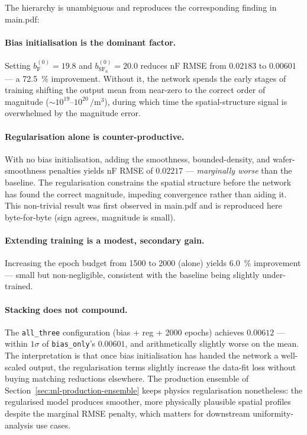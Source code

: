 The hierarchy is unambiguous and reproduces the corresponding finding in
main.pdf:

\paragraph{Bias initialisation is the dominant factor.}
Setting $b^{(0)}_\mathrm{F} = 19.8$ and $b^{(0)}_{\mathrm{SF}_6} = 20.0$
reduces nF RMSE from $0.02183$ to $0.00601$ — a \SI{72.5}{\percent}
improvement. Without it, the network spends the early stages of training
shifting the output mean from near-zero to the correct order of magnitude
($\sim$$10^{19}$--$10^{20}\,\si{\per\meter\cubed}$), during which time the
spatial-structure signal is overwhelmed by the magnitude error.

\paragraph{Regularisation alone is counter-productive.}
With no bias initialisation, adding the smoothness, bounded-density, and
wafer-smoothness penalties yields nF RMSE of $0.02217$ — \emph{marginally
worse} than the baseline. The regularisation constrains the spatial
structure before the network has found the correct magnitude, impeding
convergence rather than aiding it. This non-trivial result was first
observed in main.pdf and is reproduced here byte-for-byte (sign agrees,
magnitude is small).

\paragraph{Extending training is a modest, secondary gain.}
Increasing the epoch budget from \num{1500} to \num{2000} (alone) yields
\SI{6.0}{\percent} improvement — small but non-negligible, consistent with
the baseline being slightly under-trained.

\paragraph{Stacking does not compound.}
The \texttt{all\_three} configuration (bias + reg + 2000 epochs) achieves
$0.00612$ — within $1\sigma$ of \texttt{bias\_only}'s $0.00601$, and
arithmetically slightly worse on the mean. The interpretation is that once
bias initialisation has handed the network a well-scaled output, the
regularisation terms slightly increase the data-fit loss without buying
matching reductions elsewhere. The production ensemble of
Section~\ref{sec:ml-production-ensemble} keeps physics regularisation
nonetheless: the regularised model produces smoother, more physically
plausible spatial profiles despite the marginal RMSE penalty, which
matters for downstream uniformity-analysis use cases.

